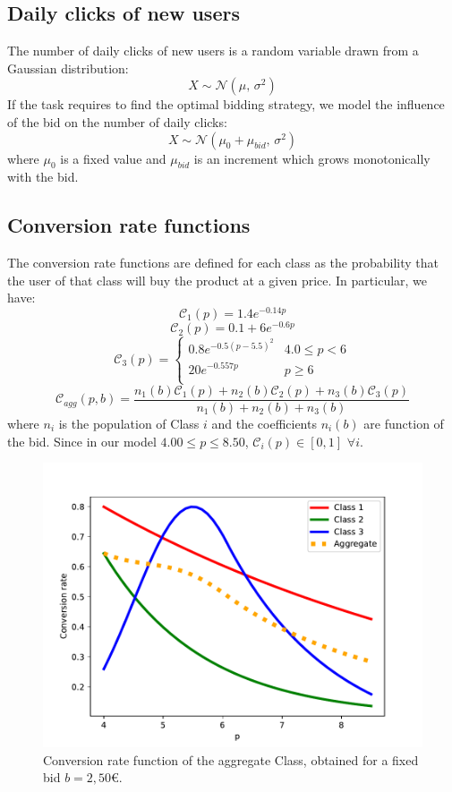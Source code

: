 \documentclass[12pt,a4paper]{report}
\begin{document}
			\subsection{Daily clicks of new users}
The number of daily clicks of new users is a random variable drawn from a Gaussian distribution:
\[ X\sim \mathcal{N}(\mu,\,\sigma^{2})\]
If the task requires to find the optimal bidding strategy, we model the influence of the bid on the number of daily clicks:
\[ X\sim \mathcal{N}(\mu_0+\mu_{bid},\,\sigma^{2})\]
where $\mu_0$ is a fixed value and $\mu_{bid}$ is an increment which grows monotonically with the bid.

			\subsection{Conversion rate functions}
The conversion rate functions are defined for each class as the probability that the user of that class will buy the product at a given price. In particular, we have:
\[ \mathcal C_1(p) =  1.4 e^{-0.14p}    \]
\[ \mathcal C_2(p) = 0.1+ 6 e^{-0.6p}    \]
\[   \mathcal C_3(p) = \left\{
\begin{array}{ll}
      0.8 e^{-0.5(p-5.5)^2} & 4.0\leq p< 6 \\
      20 e^{-0.557p} & p \geq 6 \\
\end{array} 
\right. \]
\[ \mathcal C_{agg}(p, b) =\frac{n_1(b)\mathcal C_1(p)+n_2(b)\mathcal C_2(p)+n_3(b)\mathcal C_3(p)}{n_1(b)+n_2(b)+n_3(b)}\] 
where $n_i$ is the population of Class $i$ and the coefficients $n_i(b)$ are function of the bid.
Since in our model $4.00 \leq p \leq 8.50$, $\mathcal C_i(p) \in [0,1]$ $ \forall i$.
\begin{figure}[H]
\centering
  \includegraphics[scale = 0.8, center]{Cagg}
  \caption{Conversion rate function of the aggregate Class, obtained for a fixed bid $b=2,50$\euro.}
\end{figure}
\end{document}
